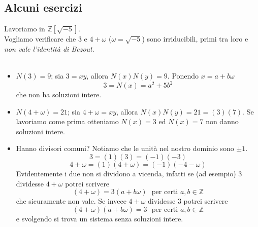 \subsection{Alcuni esercizi}

\begin{esercizio}
Lavoriamo in $\mathbb{Z}[\sqrt{-5}]$. \\ Vogliamo verificare che 3 e $4+\omega$ ($\omega=\sqrt{-5}$) sono irriducibili, primi tra loro e \textit{non vale l'identità di Bezout}. \\ \\
\begin{itemize}
	\item $N(3)=9$; sia $3=xy$, allora $N(x)N(y)=9$. Ponendo $x=a+b\omega$
	\begin{equation*}
	3=N(x)=a^2+5b^2
	\end{equation*}
	che non ha soluzioni intere.
	\item $N(4+\omega)=21$; sia $4+\omega=xy$, allora $N(x)N(y)=21=(3)(7)$. Se lavoriamo come prima otteniamo $N(x)=3$ ed $N(x)=7$ non danno soluzioni intere.
	\item Hanno divisori comuni? Notiamo che le unità nel nostro dominio sono $\pm1$.
	\begin{equation*}
	3=(1)(3)=(-1)(-3)
	\end{equation*}
	\begin{equation*}
	4+\omega=(1)(4+\omega)=(-1)(-4-\omega)
	\end{equation*}
	Evidentemente i due non si dividono a vicenda, infatti se (ad esempio) 3 dividesse $4+\omega$ potrei scrivere
	\begin{equation*}
	(4+\omega)=3(a+b\omega) \ \ \ \text{per certi $a,b\in\mathbb{Z}$}
	\end{equation*}
	che sicuramente non vale. Se invece $4+\omega$ dividesse 3 potrei scrivere
	\begin{equation*}
	(4+\omega)(a+b\omega)=3 \ \ \ \text{per certi $a,b\in\mathbb{Z}$}
	\end{equation*}
	e svolgendo si trova un sistema senza soluzioni intere.

\end{itemize}
\end{esercizio}
